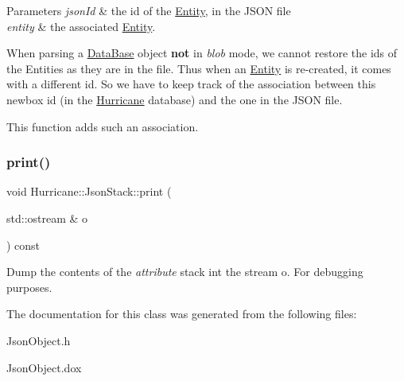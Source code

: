 \begin{DoxyParams}{Parameters}
{\em json\+Id} & the {\ttfamily id} of the \mbox{\hyperlink{classHurricane_1_1Entity}{Entity}}, in the J\+S\+ON file \\
\hline
{\em entity} & the associated \mbox{\hyperlink{classHurricane_1_1Entity}{Entity}}.\\
\hline
\end{DoxyParams}
When parsing a \mbox{\hyperlink{classHurricane_1_1DataBase}{Data\+Base}} object {\bfseries not} in {\itshape blob} mode, we cannot restore the ids of the Entities as they are in the file. Thus when an \mbox{\hyperlink{classHurricane_1_1Entity}{Entity}} is re-\/created, it comes with a different id. So we have to keep track of the association between this newbox id (in the \mbox{\hyperlink{namespaceHurricane}{Hurricane}} database) and the one in the J\+S\+ON file.

This function adds such an association. \mbox{\label{classHurricane_1_1JsonStack_a7e0364c8868b8396db10399a855b8aa1}} 
\subsubsection{\texorpdfstring{print()}{print()}}
{\footnotesize\ttfamily void Hurricane\+::\+Json\+Stack\+::print (\begin{DoxyParamCaption}\item[{std\+::ostream \&}]{o }\end{DoxyParamCaption}) const}

Dump the contents of the {\itshape attribute} stack int the stream {\ttfamily o}. For debugging purposes. 

The documentation for this class was generated from the following files\+:\begin{DoxyCompactItemize}
\item 
Json\+Object.\+h\item 
Json\+Object.\+dox\end{DoxyCompactItemize}
